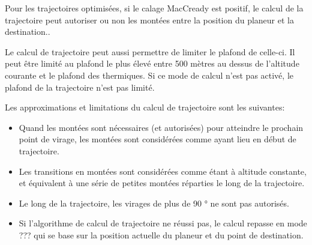 Pour les trajectoires optimisées, si le calage MacCready est positif, le calcul de la trajectoire peut autoriser ou non les montées entre la position du planeur et la destination..

Le calcul de trajectoire peut aussi permettre de limiter le plafond de celle-ci. Il peut être limité au plafond le plus élevé entre 500 mètres au dessus de l'altitude courante et le plafond des thermiques. Si ce mode de calcul n'est pas activé, le plafond de la trajectoire n'est pas limité.


Les approximations et limitations du calcul de trajectoire sont les suivantes:
\begin{itemize}
\item Quand les montées sont nécessaires (et autorisées) pour atteindre le prochain point de virage, les montées sont considérées comme ayant lieu en début de trajectoire.
\item Les transitions en montées sont considérées comme étant à altitude constante, et équivalent à une série de petites montées réparties le long de la trajectoire.
\item Le long de la trajectoire, les virages de plus de 90 ° ne sont pas autorisés.
\item Si l'algorithme de calcul de trajectoire ne réussi pas, le calcul repasse en mode ??? qui se base sur la position actuelle du planeur et du point de destination.
\end{itemize}

